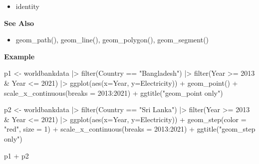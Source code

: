 \documentclass[
  letterpaper,
  DIV=11,
  numbers=noendperiod]{scrreprt}
\newenvironment{Shaded}{\begin{snugshade}}{\end{snugshade}}
\newcommand{\AttributeTok}[1]{\textcolor[rgb]{0.40,0.45,0.13}{#1}}
\newcommand{\DecValTok}[1]{\textcolor[rgb]{0.68,0.00,0.00}{#1}}
\newcommand{\FunctionTok}[1]{\textcolor[rgb]{0.28,0.35,0.67}{#1}}
\newcommand{\NormalTok}[1]{\textcolor[rgb]{0.00,0.23,0.31}{#1}}
\newcommand{\OtherTok}[1]{\textcolor[rgb]{0.00,0.23,0.31}{#1}}
\newcommand{\SpecialCharTok}[1]{\textcolor[rgb]{0.37,0.37,0.37}{#1}}
\newcommand{\StringTok}[1]{\textcolor[rgb]{0.13,0.47,0.30}{#1}}
\providecommand{\tightlist}{%
  \setlength{\itemsep}{0pt}\setlength{\parskip}{0pt}}\usepackage{longtable,booktabs,array}
\begin{document}
\begin{itemize}
\tightlist
\item
  identity
\end{itemize}

\textbf{See Also}

\begin{itemize}
\tightlist
\item
  geom\_path(), geom\_line(), geom\_polygon(), geom\_segment()
\end{itemize}

\textbf{Example}

\begin{Shaded}
\begin{Highlighting}[]
\NormalTok{p1 }\OtherTok{\textless{}{-}}\NormalTok{ worldbankdata }\SpecialCharTok{|\textgreater{}} 
  \FunctionTok{filter}\NormalTok{(Country }\SpecialCharTok{==} \StringTok{"Bangladesh"}\NormalTok{) }\SpecialCharTok{|\textgreater{}}
  \FunctionTok{filter}\NormalTok{(Year }\SpecialCharTok{\textgreater{}=} \DecValTok{2013} \SpecialCharTok{\&}\NormalTok{ Year }\SpecialCharTok{\textless{}=} \DecValTok{2021}\NormalTok{) }\SpecialCharTok{|\textgreater{}}
  \FunctionTok{ggplot}\NormalTok{(}\FunctionTok{aes}\NormalTok{(}\AttributeTok{x=}\NormalTok{Year, }\AttributeTok{y=}\NormalTok{Electricity)) }\SpecialCharTok{+} 
  \FunctionTok{geom\_point}\NormalTok{() }\SpecialCharTok{+} 
  \FunctionTok{scale\_x\_continuous}\NormalTok{(}\AttributeTok{breaks =} \DecValTok{2013}\SpecialCharTok{:}\DecValTok{2021}\NormalTok{)  }\SpecialCharTok{+} 
  \FunctionTok{ggtitle}\NormalTok{(}\StringTok{"geom\_point only"}\NormalTok{)}

\NormalTok{p2 }\OtherTok{\textless{}{-}}\NormalTok{ worldbankdata }\SpecialCharTok{|\textgreater{}} 
  \FunctionTok{filter}\NormalTok{(Country }\SpecialCharTok{==} \StringTok{"Sri Lanka"}\NormalTok{) }\SpecialCharTok{|\textgreater{}}
  \FunctionTok{filter}\NormalTok{(Year }\SpecialCharTok{\textgreater{}=} \DecValTok{2013} \SpecialCharTok{\&}\NormalTok{ Year }\SpecialCharTok{\textless{}=} \DecValTok{2021}\NormalTok{) }\SpecialCharTok{|\textgreater{}}
  \FunctionTok{ggplot}\NormalTok{(}\FunctionTok{aes}\NormalTok{(}\AttributeTok{x=}\NormalTok{Year, }\AttributeTok{y=}\NormalTok{Electricity)) }\SpecialCharTok{+} 
  \FunctionTok{geom\_step}\NormalTok{(}\AttributeTok{color =} \StringTok{"red"}\NormalTok{, }\AttributeTok{size =} \DecValTok{1}\NormalTok{) }\SpecialCharTok{+} 
  \FunctionTok{scale\_x\_continuous}\NormalTok{(}\AttributeTok{breaks =} \DecValTok{2013}\SpecialCharTok{:}\DecValTok{2021}\NormalTok{)  }\SpecialCharTok{+} 
  \FunctionTok{ggtitle}\NormalTok{(}\StringTok{"geom\_step only"}\NormalTok{)}

\NormalTok{p1 }\SpecialCharTok{+}\NormalTok{ p2 }
\end{Highlighting}
\end{Shaded}
\end{document}
